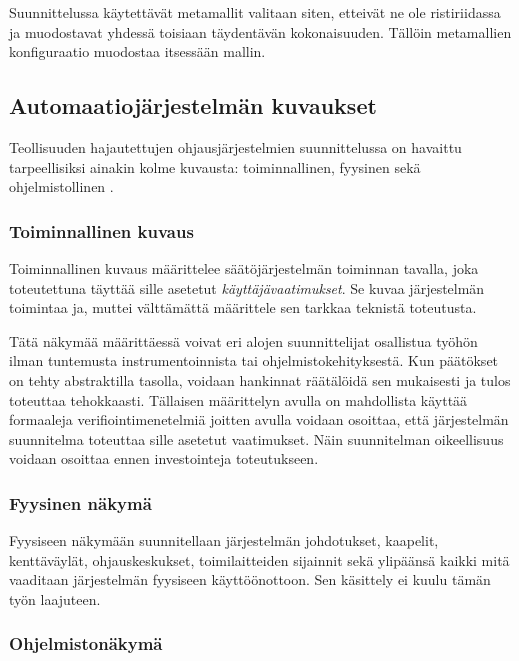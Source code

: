 \documentclass[finnish,12pt]{article}
\begin{document}
Suunnittelussa käytettävät metamallit valitaan siten, etteivät ne ole ristiriidassa ja muodostavat yhdessä toisiaan täydentävän kokonaisuuden.
Tällöin metamallien konfiguraatio muodostaa itsessään mallin.


	\subsection{Automaatiojärjestelmän kuvaukset}

Teollisuuden hajautettujen ohjausjärjestelmien suunnittelussa on havaittu
tarpeellisiksi ainakin kolme kuvausta: toiminnallinen, fyysinen sekä ohjelmistollinen \cite{RefWorks:38}.

		\subsubsection{Toiminnallinen kuvaus}

Toiminnallinen kuvaus määrittelee säätöjärjestelmän toiminnan tavalla, joka toteutettuna täyttää sille asetetut \emph{käyttäjävaatimukset}.
Se kuvaa järjestelmän toimintaa ja, muttei välttämättä määrittele sen tarkkaa teknistä toteutusta. \cite{RefWorks:60}

Tätä näkymää määrittäessä voivat eri alojen suunnittelijat osallistua työhön ilman
tuntemusta instrumentoinnista tai ohjelmistokehityksestä. Kun päätökset on tehty
abstraktilla tasolla, voidaan hankinnat räätälöidä sen mukaisesti ja tulos
toteuttaa tehokkaasti.
Tällaisen määrittelyn avulla on mahdollista käyttää formaaleja verifiointimenetelmiä joitten avulla
voidaan osoittaa, että järjestelmän suunnitelma toteuttaa sille asetetut vaatimukset.
Näin suunnitelman oikeellisuus voidaan osoittaa ennen investointeja toteutukseen. \cite{RefWorks:41}

		\subsubsection{Fyysinen näkymä}

Fyysiseen näkymään suunnitellaan järjestelmän johdotukset, kaapelit, kenttäväylät,
ohjauskeskukset, toimilaitteiden sijainnit sekä ylipäänsä kaikki mitä vaaditaan 
järjestelmän fyysiseen käyttöönottoon. Sen käsittely ei kuulu tämän työn laajuteen.

		\subsubsection{Ohjelmistonäkymä}
\end{document}
